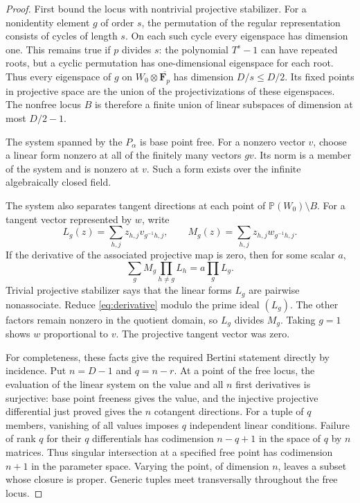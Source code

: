 \documentclass[11pt]{article}
\newcommand{\Fp}{\mathbf F_p}\newcommand{\OO}{\mathcal O}
\theoremstyle{definition}\newtheorem{definition}[theorem]{Definition}
\theoremstyle{remark}\newtheorem{remark}[theorem]{Remark}
\begin{document}
\begin{proof}
First bound the locus with nontrivial projective stabilizer. For a nonidentity element $g$ of order $s$, the permutation of the regular representation consists of cycles of length $s$. On each such cycle every eigenspace has dimension one. This remains true if $p$ divides $s$: the polynomial $T^s-1$ can have repeated roots, but a cyclic permutation has one-dimensional eigenspace for each root. Thus every eigenspace of $g$ on $W_0\otimes\overline{\Fp}$ has dimension $D/s\leq D/2$. Its fixed points in projective space are the union of the projectivizations of these eigenspaces. The nonfree locus $B$ is therefore a finite union of linear subspaces of dimension at most $D/2-1$.

The system spanned by the $P_\alpha$ is base point free. For a nonzero vector $v$, choose a linear form nonzero at all of the finitely many vectors $gv$. Its norm is a member of the system and is nonzero at $v$. Such a form exists over the infinite algebraically closed field.

The system also separates tangent directions at each point of $\mathbb P(W_0)\setminus B$. For a tangent vector represented by $w$, write
\[
 L_g(z)=\sum_{h,j}z_{h,j}v_{g^{-1}h,j},\qquad
 M_g(z)=\sum_{h,j}z_{h,j}w_{g^{-1}h,j}.
\]
If the derivative of the associated projective map is zero, then for some scalar $a$,
\begin{equation}\label{eq:derivative}
 \sum_g M_g\prod_{h\ne g}L_h=a\prod_gL_g.
\end{equation}
Trivial projective stabilizer says that the linear forms $L_g$ are pairwise nonassociate. Reduce \eqref{eq:derivative} modulo the prime ideal $(L_g)$. The other factors remain nonzero in the quotient domain, so $L_g$ divides $M_g$. Taking $g=1$ shows $w$ proportional to $v$. The projective tangent vector was zero.

For completeness, these facts give the required Bertini statement directly by incidence. Put $n=D-1$ and $q=n-r$. At a point of the free locus, the evaluation of the linear system on the value and all $n$ first derivatives is surjective: base point freeness gives the value, and the injective projective differential just proved gives the $n$ cotangent directions. For a tuple of $q$ members, vanishing of all values imposes $q$ independent linear conditions. Failure of rank $q$ for their $q$ differentials has codimension $n-q+1$ in the space of $q$ by $n$ matrices. Thus singular intersection at a specified free point has codimension $n+1$ in the parameter space. Varying the point, of dimension $n$, leaves a subset whose closure is proper. Generic tuples meet transversally throughout the free locus.


\end{proof}
\end{document}
